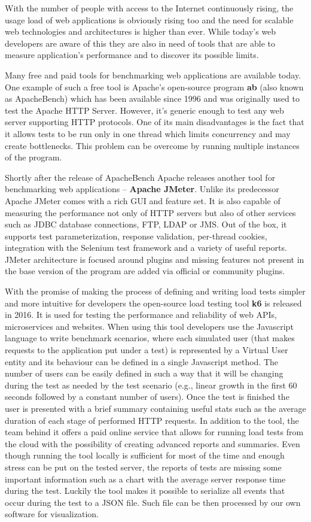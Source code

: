 \documentclass[12pt, a4paper]{article}
\begin{document}
With the number of people with access to the Internet continuously rising, the usage load of web applications is obviously rising too and the need for scalable web technologies and architectures is higher than ever.
While today's web developers are aware of this they are also in need of tools that are able to measure application's performance and to discover its possible limits.

Many free and paid tools for benchmarking web applications are available today.
One example of such a free tool is Apache's open-source program \textbf{ab} (also known as ApacheBench) which has been available since 1996 and was originally used to test the Apache HTTP Server.
However, it's generic enough to test any web server supporting HTTP protocols.
One of its main disadvantages is the fact that it allows tests to be run only in one thread which limits concurrency and may create bottlenecks.
This problem can be overcome by running multiple instances of the program.

Shortly after the release of ApacheBench Apache releases another tool for benchmarking web applications -- \textbf{Apache JMeter}.
Unlike its predecessor Apache JMeter comes with a rich GUI and feature set. It is also capable of measuring the performance not only of HTTP servers but also of other services such as JDBC database connections, FTP, LDAP or JMS.
Out of the box, it supports test parameterization, response validation, per-thread cookies, integration with the Selenium test framework and a variety of useful reports.
JMeter architecture is focused around plugins and missing features not present in the base version of the program are added via official or community plugins.

With the promise of making the process of defining and writing load tests simpler and more intuitive for developers the open-source load testing tool \textbf{k6} is released in 2016.
It is used for testing the performance and reliability of web APIs, microservices and websites.
When using this tool developers use the Javascript language to write benchmark scenarios, where each simulated user (that makes requests to the application put under a test) is represented by a Virtual User entity and its behaviour can be defined in a single Javascript method.
The number of users can be easily defined in such a way that it will be changing during the test as needed by the test scenario (e.g., linear growth in the first 60 seconds followed by a constant number of users).
Once the test is finished the user is presented with a brief summary containing useful stats such as the average duration of each stage of performed HTTP requests.
In addition to the tool, the team behind it offers a paid online service that allows for running load tests from the cloud with the possibility of creating advanced reports and summaries.
Even though running the tool locally is sufficient for most of the time and enough stress can be put on the tested server, the reports of tests are missing some important information such as a chart with the average server response time during the test.
Luckily the tool makes it possible to serialize all events that occur during the test to a JSON file.
Such file can be then processed by our own software for visualization. 
\end{document}
